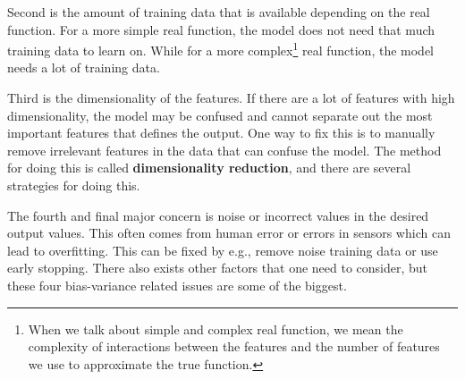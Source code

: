 \documentclass[a4paper, american, 12pt]{report}
\begin{document}
	Second is the amount of training data that is available depending on the real function. For a more simple real function, the model does not need that much training data to learn on. While for a more complex\footnote{When we talk about simple and complex real function, we mean the complexity of interactions between the features and the number of features we use to approximate the true function.} real function, the model needs a lot of training data. 
	
	Third is the dimensionality of the features. If there are a lot of features with high dimensionality, the model may be confused and cannot separate out the most important features that defines the output. One way to fix this is to manually remove irrelevant features in the data that can confuse the model. The method for doing this is called \textbf{dimensionality reduction}, and there are several strategies for doing this. 
	
	The fourth and final major concern is noise or incorrect values in the desired output values. This often comes from human error or errors in sensors which can lead to overfitting. This can be fixed by e.g., remove noise training data or use early stopping. There also exists other factors that one need to consider, but these four bias-variance related issues are some of the biggest.
	
\end{document}
